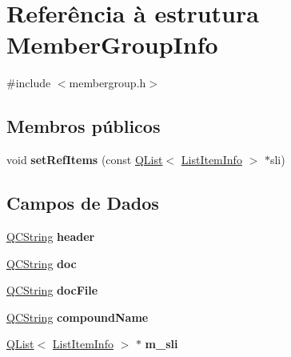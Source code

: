 \hypertarget{struct_member_group_info}{\section{Referência à estrutura Member\-Group\-Info}
\label{struct_member_group_info}
}


{\ttfamily \#include $<$membergroup.\-h$>$}

\subsection*{Membros públicos}
\begin{DoxyCompactItemize}
\item 
\hypertarget{struct_member_group_info_af54a06ad3eb9e93865968f0e10903184}{void {\bfseries set\-Ref\-Items} (const \hyperlink{class_q_list}{Q\-List}$<$ \hyperlink{struct_list_item_info}{List\-Item\-Info} $>$ $\ast$sli)}\label{struct_member_group_info_af54a06ad3eb9e93865968f0e10903184}

\end{DoxyCompactItemize}
\subsection*{Campos de Dados}
\begin{DoxyCompactItemize}
\item 
\hypertarget{struct_member_group_info_aa1dbe2e4faebc985447597460735f914}{\hyperlink{class_q_c_string}{Q\-C\-String} {\bfseries header}}\label{struct_member_group_info_aa1dbe2e4faebc985447597460735f914}

\item 
\hypertarget{struct_member_group_info_a9910424bf5401d657c3b3fdff6fcc152}{\hyperlink{class_q_c_string}{Q\-C\-String} {\bfseries doc}}\label{struct_member_group_info_a9910424bf5401d657c3b3fdff6fcc152}

\item 
\hypertarget{struct_member_group_info_a9e442ea1f041f60c49f78a7716ef5e20}{\hyperlink{class_q_c_string}{Q\-C\-String} {\bfseries doc\-File}}\label{struct_member_group_info_a9e442ea1f041f60c49f78a7716ef5e20}

\item 
\hypertarget{struct_member_group_info_afc85c315b8374e53c0dda99c1505d225}{\hyperlink{class_q_c_string}{Q\-C\-String} {\bfseries compound\-Name}}\label{struct_member_group_info_afc85c315b8374e53c0dda99c1505d225}

\item 
\hypertarget{struct_member_group_info_a9aa1ad59f0e655e3a8a19c86cbcc5a1d}{\hyperlink{class_q_list}{Q\-List}$<$ \hyperlink{struct_list_item_info}{List\-Item\-Info} $>$ $\ast$ {\bfseries m\-\_\-sli}}\label{struct_member_group_info_a9aa1ad59f0e655e3a8a19c86cbcc5a1d}

\end{DoxyCompactItemize}



